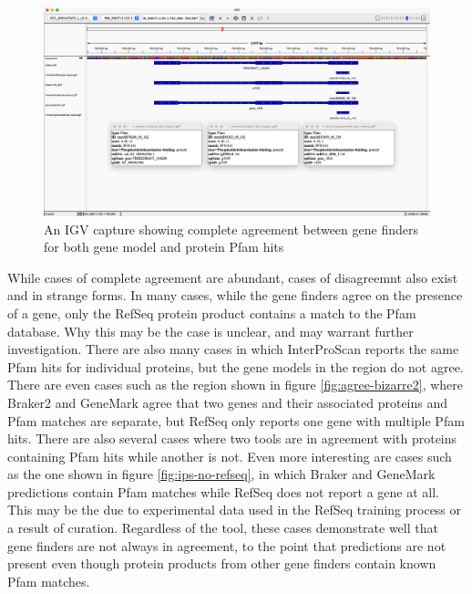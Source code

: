 \begin{figure}[h!]
  \centering
  \includegraphics[width=\textwidth]{figures/igv/ips-basic-agree.png}
  \caption[Agreeing Pfam matches]{An IGV capture showing complete
    agreement between gene finders for both gene model and protein
    Pfam hits}
  \label{fig:basic-agree}
\end{figure}

While cases of complete agreement are abundant, cases of disagreemnt
also exist and in strange forms. In many cases, while the gene finders
agree on the presence of a gene, only the RefSeq protein product
contains a match to the Pfam database. Why this may be the case is
unclear, and may warrant further investigation. There are also many
cases in which InterProScan reports the same Pfam hits for individual
proteins, but the gene models in the region do not agree. There are
even cases such as the region shown in figure
\ref{fig:agree-bizarre2}, where Braker2 and GeneMark agree that two
genes and their associated proteins and Pfam matches are separate, but
RefSeq only reports one gene with multiple Pfam hits. There are also
several cases where two tools are in agreement with proteins
containing Pfam hits while another is not. Even more interesting are
cases such as the one shown in figure \ref{fig:ips-no-refseq}, in
which Braker and GeneMark predictions contain Pfam matches while
RefSeq does not report a gene at all. This may be the due to
experimental data used in the RefSeq training process or a result of
curation. Regardless of the tool, these cases demonstrate well that
gene finders are not always in agreement, to the point that
predictions are not present even though protein products from other
gene finders contain known Pfam matches.

